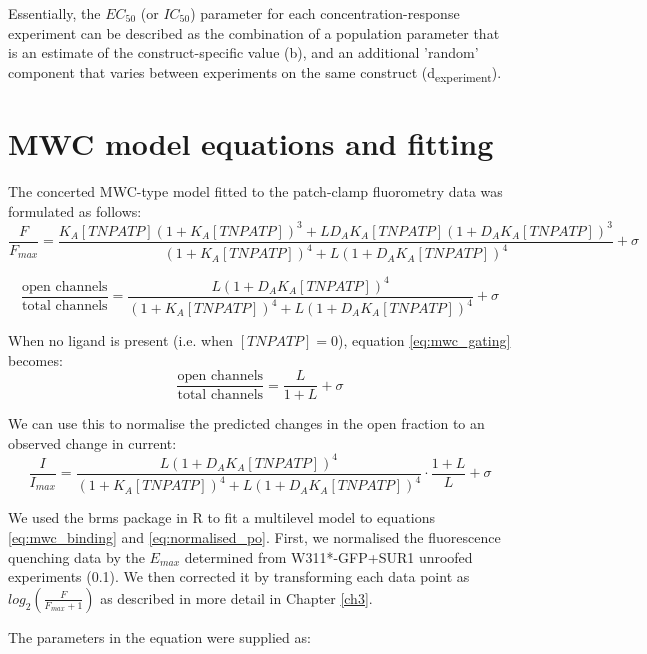 Essentially, the $EC_{50}$ (or $IC_{50}$) parameter for each concentration-response experiment can be described as the combination of a population parameter that is an estimate of the construct-specific value (\textgreek{b}), and an additional 'random' component that varies between experiments on the same construct (\textgreek{d}\textsubscript{experiment}).

\section{MWC model equations and fitting}

The concerted MWC-type model fitted to the patch-clamp fluorometry data was formulated as follows:
\begin{equation} \label{eq:mwc_binding}
\frac{F}{F_{max}} = \frac
    {K_A[TNPATP](1+K_A[TNPATP])^3+LD_AK_A[TNPATP](1+D_AK_A[TNPATP])^3}
    {(1+K_A[TNPATP])^4+L(1+D_AK_A[TNPATP])^4} + \sigma
\end{equation}

\begin{equation} \label{eq:mwc_gating}
\frac{\text{open channels}}{\text{total channels}} = \frac
    {L(1+D_AK_A[TNPATP])^4}
    {(1+K_A[TNPATP])^4+L(1+D_AK_A[TNPATP])^4} + \sigma
\end{equation}

When no ligand is present (i.e. when $[TNPATP] = 0$), equation \ref{eq:mwc_gating} becomes:
\begin{equation} \label{eq:intrinsic_po}
\frac{\text{open channels}}{\text{total channels}} = \frac
    {L}
    {1+L} + \sigma
\end{equation}

We can use this to normalise the predicted changes in the open fraction to an observed change in current:
\begin{equation} \label{eq:normalised_po}
\frac{I}{I_{max}} = \frac
    {L(1+D_AK_A[TNPATP])^4}
    {(1+K_A[TNPATP])^4+L(1+D_AK_A[TNPATP])^4}\cdot
   \frac
    {1+L}
    {L} + \sigma
\end{equation}

We used the brms package in R to fit a multilevel model to equations \ref{eq:mwc_binding} and \ref{eq:normalised_po}.
First, we normalised the fluorescence quenching data by the $E_{max}$ determined from W311*-GFP+SUR1 unroofed experiments (0.1).
We then corrected it by transforming each data point as $log_2(\frac{F}{F_{max} + 1})$ as described in more detail in Chapter \ref{ch3}.

The parameters in the equation were supplied as:

